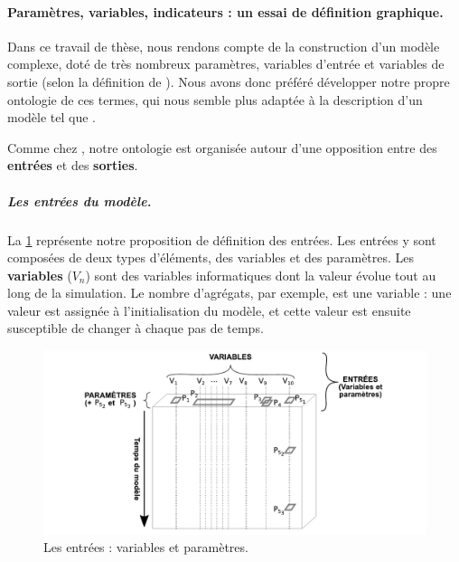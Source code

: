 \paragraph{Paramètres, variables, indicateurs : un essai de définition graphique.}\label{subsubsec:mes_definitions_params}

Dans ce travail de thèse, nous rendons compte de la construction d'un modèle complexe, doté de très nombreux paramètres, variables d'entrée et variables de sortie (selon la définition de \citeauthor{balci_validation_1994}).
Nous avons donc préféré développer notre propre \og ontologie\fg{} de ces termes, qui nous semble plus adaptée à la description d'un modèle tel que \simfeodal{}.

Comme chez \citeauthor{balci_validation_1994}, notre ontologie est organisée autour d'une opposition entre des \textbf{entrées} et des \textbf{sorties}.

\subparagraph{Les entrées du modèle.}
La \cref{fig:parametres-these-entrees} représente notre proposition de définition des entrées.
Les entrées y sont composées de deux types d'éléments, des variables et des paramètres.
Les \textbf{variables} ($V_n$) sont des variables informatiques dont la valeur évolue tout au long de la simulation.
Le nombre d'agrégats, par exemple, est une variable : une valeur est assignée à l'initialisation du modèle, et cette valeur est ensuite susceptible de changer à chaque pas de temps.

\begin{figure}[H]
	\includegraphics[width=\linewidth]{img/schemas_params_1_entrees.pdf}
	\caption{Les entrées : variables et paramètres.} 
	\label{fig:parametres-these-entrees} 
\end{figure}


